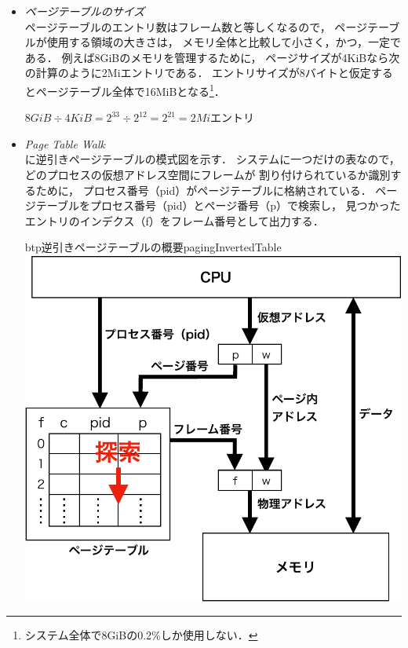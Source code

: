 \begin{itemize}
\item \emph{ページテーブルのサイズ} \\
  ページテーブルのエントリ数はフレーム数と等しくなるので，
  ページテーブルが使用する領域の大きさは，
  メモリ全体と比較して小さく，かつ，一定である．
  例えば8GiBのメモリを管理するために，
  ページサイズが4KiBなら次の計算のように2Miエントリである．
  エントリサイズが8バイトと仮定するとページテーブル全体で16MiBとなる\footnote{
    システム全体で8GiBの0.2\%しか使用しない．}．

  \centerline{$8GiB \div 4KiB = 2^{33} \div 2^{12} = 2^{21} = 2Mi$エントリ}

\item \emph{Page Table Walk} \\
  に逆引きページテーブルの模式図を示す．
  システムに一つだけの表なので，
  どのプロセスの仮想アドレス空間にフレームが
  割り付けられているか識別するために，
  プロセス番号（pid）がページテーブルに格納されている．
  ページテーブルをプロセス番号（pid）とページ番号（p）で検索し，
  見つかったエントリのインデクス（f）をフレーム番号として出力する．

  \begin{myfig}{btp}{逆引きページテーブルの概要}{pagingInvertedTable}
    \includegraphics[scale=0.66]{Fig/pagingInvertedTable-crop.pdf}
  \end{myfig}


\end{itemize}
